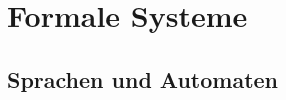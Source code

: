 \documentclass[a4paper,10pt]{article}
\begin{document}


    \section{Formale Systeme}
    \subsection{Sprachen und Automaten}
\end{document}
